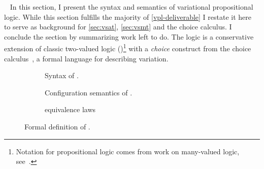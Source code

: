 ~\label{sec:vpl} In this section, I present the syntax and semantics of
variational propositional logic. While this section fulfills the majority of
\autoref{vpl-deliverable} I restate it here to serve as background for
\autoref{sec:vsat}, \autoref{sec:vsmt} and the choice calculus. I conclude the
section by summarizing work left to do.
%
The logic is a conservative extension of classic two-valued logic
(\pl{})\footnote{Notation for propositional logic comes from work on many-valued
  logic, see~\cite{Rescher1969-RESML}.} with a \emph{choice} construct from the
choice calculus~\cite{EW11tosem,Walk13thesis}, a formal language for describing
variation.


\begin{figure}[h!]
  \begin{subfigure}[t]{\textwidth}
    \centering
    
    \caption{Syntax of \vpl{}.}%
    \label{fig:cc:stx}
  \end{subfigure}
  \begin{subfigure}[t]{\textwidth}
    
    \centering
    \caption{Configuration semantics of \vpl{}.}%
    \label{fig:cc:cfg}
  \end{subfigure}
  \begin{subfigure}[t]{\textwidth}
    
    \centering
    \caption{\vpl{} equivalence laws}%
    \label{fig:cc:eqv}
    \vspace{0.4cm}
  \end{subfigure}
\caption{Formal definition of \vpl{}.}%
\label{fig:cc}
\end{figure}
%
%


